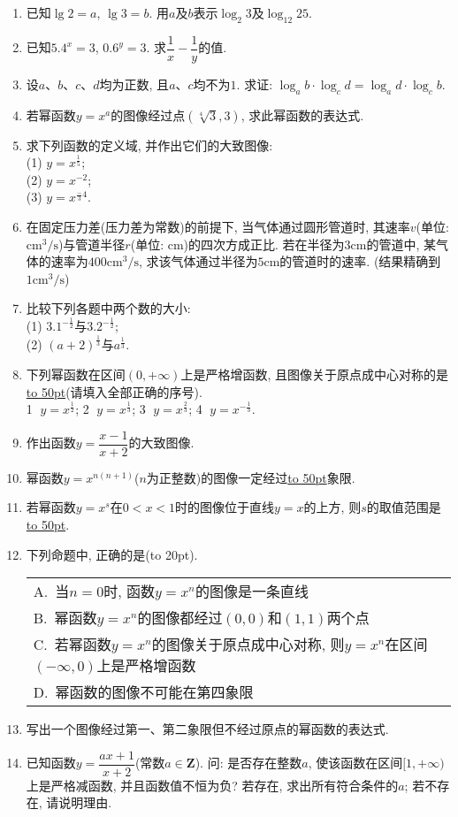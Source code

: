 \documentclass[10pt,a4paper]{article}
\newcommand{\blank}[1]{\underline{\hbox to #1pt{}}}
\newcommand{\bracket}[1]{(\hbox to #1pt{})}
\newcommand{\onech}[4]{\par\begin{tabular}{p{.9\textwidth}}
A.~#1\\
B.~#2\\
C.~#3\\
D.~#4
\end{tabular}}
\begin{document}
\begin{enumerate}[1.]
\item 已知$\lg 2=a$, $\lg 3=b$. 用$a$及$b$表示$\log_2 3$及$\log_{12}25$.
\item 已知$5.4^x=3$, $0.6^y=3$. 求$\dfrac 1x-\dfrac 1y$的值.
\item 设$a$、$b$、$c$、$d$均为正数, 且$a$、$c$均不为$1$. 求证:
$\log_ab\cdot \log_cd=\log_ad\cdot \log_cb$. 
\item 若幂函数$y=x^a$的图像经过点$(\sqrt[4]{3}, 3)$, 求此幂函数的表达式.
\item 求下列函数的定义域, 并作出它们的大致图像:\\
(1) $y=x^\frac 15$;\\
(2) $y=x^{-2}$;\\
(3) $y=x^{\frac -34}$.
\item 在固定压力差(压力差为常数)的前提下, 当气体通过圆形管道时, 其速率$v$(单位: $\text{cm}^3/\text{s}$)与管道半径$r$(单位: $\text{cm}$)的四次方成正比. 若在半径为$3\text{cm}$的管道中, 某气体的速率为$400\text{cm}^3/\text{s}$, 求该气体通过半径为$5\text{cm}$的管道时的速率. (结果精确到$1\text{cm}^3/\text{s}$)
\item 比较下列各题中两个数的大小:\\
(1) $3.1^{-\frac 12}$与$3.2^{-\frac 12}$;\\
(2) $(a+2)^{\frac 13}$与$a^{\frac 13}$.
\item 下列幂函数在区间$(0, +\infty)$上是严格增函数, 且图像关于原点成中心对称的是\blank{50}(请填入全部正确的序号).\\
\textcircled{1} $y=x^\frac 12$; \textcircled{2} $y=x^\frac 13$; \textcircled{3} $y=x^\frac 23$; \textcircled{4} $y=x^{-\frac 13}$.
\item 作出函数$y=\dfrac{x-1}{x+2}$的大致图像.
\item 幂函数$y=x^{n(n+1)}$($n$为正整数)的图像一定经过\blank{50}象限.
\item 若幂函数$y=x^s$在$0<x<1$时的图像位于直线$y=x$的上方, 则$s$的取值范围是\blank{50}.
\item 下列命题中, 正确的是\bracket{20}.
\onech{当$n=0$时, 函数$y=x^n$的图像是一条直线}{幂函数$y=x^n$的图像都经过$(0, 0)$和$(1, 1)$两个点}{若幂函数$y=x^n$的图像关于原点成中心对称, 则$y=x^n$在区间$(-\infty, 0)$上是严格增函数}{幂函数的图像不可能在第四象限}
\item 写出一个图像经过第一、第二象限但不经过原点的幂函数的表达式.
\item 已知函数$y=\dfrac{ax+1}{x+2}$(常数$a\in \mathbf{Z}$). 问: 是否存在整数$a$, 使该函数在区间$[1, +\infty)$上是严格减函数, 并且函数值不恒为负?  若存在, 求出所有符合条件的$a$; 若不存在, 请说明理由. 

\end{enumerate}
\end{document}
